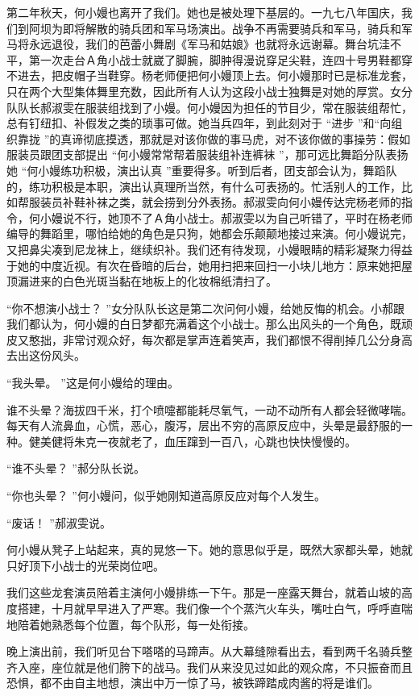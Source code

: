 \documentclass[12pt,twoside,openany]{book}
\begin{document}
第二年秋天，何小嫚也离开了我们。她也是被处理下基层的。一九七八年国庆，我们到阿坝为即将解散的骑兵团和军马场演出。战争不再需要骑兵和军马，骑兵和军马将永远退役，我们的芭蕾小舞剧《军马和姑娘》也就将永远谢幕。舞台坑洼不平，第一次走台Ａ角小战士就崴了脚腕，脚肿得漫说穿足尖鞋，连四十号男鞋都穿不进去，把皮帽子当鞋穿。杨老师便把何小嫚顶上去。何小嫚那时已是标准龙套，只在两个大型集体舞里充数，因此所有人认为这段小战士独舞是对她的厚赏。女分队队长郝淑雯在服装组找到了小嫚。何小嫚因为担任的节目少，常在服装组帮忙，总有钉纽扣、补假发之类的琐事可做。她当兵四年，到此刻对于 “进步 ”和“向组织靠拢 ”的真谛彻底摸透，那就是对该你做的事马虎，对不该你做的事操劳：假如服装员跟团支部提出 “何小嫚常常帮着服装组补连裤袜 ”，那可远比舞蹈分队表扬她 “何小嫚练功积极，演出认真 ”重要得多。听到后者，团支部会认为，舞蹈队的，练功积极是本职，演出认真理所当然，有什么可表扬的。忙活别人的工作，比如帮服装员补鞋补袜之类，就会捞到分外表扬。郝淑雯向何小嫚传达完杨老师的指令，何小嫚说不行，她顶不了Ａ角小战士。郝淑雯以为自己听错了，平时在杨老师编导的舞蹈里，哪怕给她的角色是只狗，她都会乐颠颠地接过来演。何小嫚说完，又把鼻尖凑到尼龙袜上，继续织补。我们还有待发现，小嫚眼睛的精彩凝聚力得益于她的中度近视。有次在昏暗的后台，她用扫把来回扫一小块儿地方：原来她把屋顶漏进来的白色光斑当黏在地板上的化妆棉纸清扫了。

“你不想演小战士？ ”女分队队长这是第二次问何小嫚，给她反悔的机会。小郝跟我们都认为，何小嫚的白日梦都充满着这个小战士。那么出风头的一个角色，既顽皮又憨拙，非常讨观众好，每次都是掌声连着笑声，我们都恨不得削掉几公分身高去出这份风头。

“我头晕。 ”这是何小嫚给的理由。

谁不头晕？海拔四千米，打个喷嚏都能耗尽氧气，一动不动所有人都会轻微哮喘。每天有人流鼻血，心慌，恶心，腹泻，层出不穷的高原反应中，头晕是最舒服的一种。健美健将朱克一夜就老了，血压蹿到一百八，心跳也快快慢慢的。

“谁不头晕？ ”郝分队长说。

“你也头晕？ ”何小嫚问，似乎她刚知道高原反应对每个人发生。

“废话！ ”郝淑雯说。

何小嫚从凳子上站起来，真的晃悠一下。她的意思似乎是，既然大家都头晕，她就只好顶下小战士的光荣岗位吧。

我们这些龙套演员陪着主演何小嫚排练一下午。那是一座露天舞台，就着山坡的高度搭建，十月就早早进入了严寒。我们像一个个蒸汽火车头，嘴吐白气，呼呼直喘地陪着她熟悉每个位置，每个队形，每一处衔接。

晚上演出前，我们听见台下嗒嗒的马蹄声。从大幕缝隙看出去，看到两千名骑兵整齐入座，座位就是他们胯下的战马。我们从来没见过如此的观众席，不只振奋而且恐惧，都不由自主地想，演出中万一惊了马，被铁蹄踏成肉酱的将是谁们。
\end{document}
